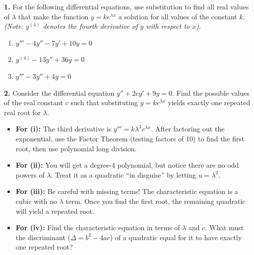 \begin{problem}
\textbf{1.} For the following differential equations, use substitution to find all real values of $\lambda$ that make the function $y = ke^{\lambda x}$ a solution for all values of the constant $k$. \\
\textit{(Note: $y^{(4)}$ denotes the fourth derivative of $y$ with respect to $x$)}.

\begin{enumerate}
    \item[\textbf{i}] $y''' - 4y'' - 7y' + 10y = 0$
    \item[\textbf{ii}] $y^{(4)} - 13y'' + 36y = 0$
    \item[\textbf{iii}] $y''' - 3y'' + 4y = 0$
\end{enumerate}

\vspace{0.3cm}
\textbf{2. } Consider the differential equation $y'' + 2cy' + 9y = 0$. Find the possible values of the real constant $c$ such that substituting $y = ke^{\lambda x}$ yields exactly one repeated real root for $\lambda$. 
\end{problem}

\begin{hint}
\begin{itemize}
    \item \textbf{For (i):} The third derivative is $y''' = k\lambda^3 e^{\lambda x}$. After factoring out the exponential, use the Factor Theorem (testing factors of 10) to find the first root, then use polynomial long division.
    \item \textbf{For (ii):} You will get a degree-4 polynomial, but notice there are no odd powers of $\lambda$. Treat it as a quadratic ``in disguise'' by letting $u = \lambda^2$.
    \item \textbf{For (iii):} Be careful with missing terms! The characteristic equation is a cubic with no $\lambda$ term. Once you find the first root, the remaining quadratic will yield a repeated root.
    \item \textbf{For (iv):} Find the characteristic equation in terms of $\lambda$ and $c$. What must the discriminant ($\Delta = b^2 - 4ac$) of a quadratic equal for it to have exactly one repeated root?
\end{itemize}
\end{hint}

